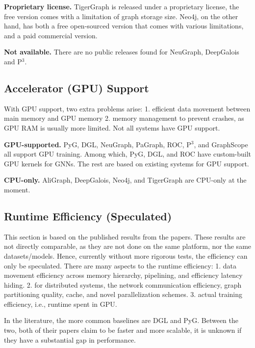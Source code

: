 \vspace{2mm}
\noindent \textbf{Proprietary license.}
TigerGraph is released under a proprietary license, the free version comes with a limitation of graph storage size. Neo4j, on the other hand, has both a free open-sourced version that comes with various limitations, and a paid commercial version.

\vspace{2mm}
\noindent \textbf{Not available.}
There are no public releases found for NeuGraph, DeepGalois and P$^3$.




\subsection{Accelerator (GPU) Support}
With GPU support, two extra problems arise: 1. efficient data movement between main memory and GPU memory 2. memory management to prevent crashes, as GPU RAM is usually more limited. Not all systems have GPU support.

\vspace{2mm}
\noindent \textbf{GPU-supported.} PyG, DGL, NeuGraph, PaGraph, ROC, P$^{3}$, and GraphScope all support GPU training. Among which, PyG, DGL, and ROC have custom-built GPU kernels for GNNs. The rest are based on existing systems for GPU support.

\vspace{2mm}
\noindent \textbf{CPU-only.} AliGraph, DeepGalois, Neo4j, and TigerGraph are CPU-only at the moment.

\subsection{Runtime Efficiency (Speculated)}
This section is based on the published results from the papers. These results are not directly comparable, as they are not done on the same platform, nor the same datasets/models. Hence, currently without more rigorous tests, the efficiency can only be speculated. There are many aspects to the runtime efficiency: 1. data movement efficiency across memory hierarchy, pipelining, and efficiency latency hiding. 2. for distributed systems, the network communication efficiency, graph partitioning quality, cache, and novel parallelization schemes. 3. actual training efficiency, i.e., runtime spent in GPU. 

In the literature, the more common baselines are DGL and PyG. Between the two, both of their papers claim to be faster and more scalable, it is unknown if they have a substantial gap in performance.

